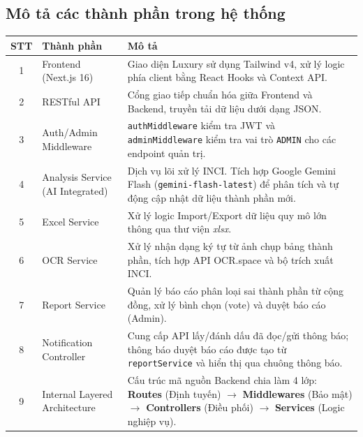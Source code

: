 \documentclass[12pt,a4paper]{article}
\begin{document}
\subsection{Mô tả các thành phần trong hệ thống}

\renewcommand{\arraystretch}{1.3}
\begin{table}[H]
\centering
{}
\begin{tabularx}{\textwidth}{|c|>{\centering\arraybackslash}p{3.5cm}|X|}
\hline
\rowcolor{gray!30}
\textbf{STT} & \textbf{Thành phần} & \textbf{Mô tả} \\
\hline

1 & Frontend (Next.js 16) & Giao diện Luxury sử dụng Tailwind v4, xử lý logic phía client bằng React Hooks và Context API. \\
\hline

2 & RESTful API & Cổng giao tiếp chuẩn hóa giữa Frontend và Backend, truyền tải dữ liệu dưới dạng JSON. \\
\hline

3 & Auth/Admin Middleware & \texttt{authMiddleware} kiểm tra JWT và \texttt{adminMiddleware} kiểm tra vai trò \texttt{ADMIN} cho các endpoint quản trị. \\
\hline

4 & Analysis Service (AI Integrated) & Dịch vụ lõi xử lý INCI. Tích hợp Google Gemini Flash (\texttt{gemini-flash-latest}) để phân tích và tự động cập nhật dữ liệu thành phần mới. \\
\hline

5 & Excel Service & Xử lý logic Import/Export dữ liệu quy mô lớn thông qua thư viện \textit{xlsx}. \\
\hline

6 & OCR Service & Xử lý nhận dạng ký tự từ ảnh chụp bảng thành phần, tích hợp API OCR.space và bộ trích xuất INCI. \\
\hline

7 & Report Service & Quản lý báo cáo phân loại sai thành phần từ cộng đồng, xử lý bình chọn (vote) và duyệt báo cáo (Admin). \\
\hline

8 & Notification Controller & Cung cấp API lấy/đánh dấu đã đọc/gửi thông báo; thông báo duyệt báo cáo được tạo từ \texttt{reportService} và hiển thị qua chuông thông báo. \\
\hline

9 & Internal Layered Architecture & Cấu trúc mã nguồn Backend chia làm 4 lớp: \textbf{Routes} (Định tuyến) $\rightarrow$ \textbf{Middlewares} (Bảo mật) $\rightarrow$ \textbf{Controllers} (Điều phối) $\rightarrow$ \textbf{Services} (Logic nghiệp vụ). \\
\hline


\end{tabularx}
\end{table}
\end{document}
